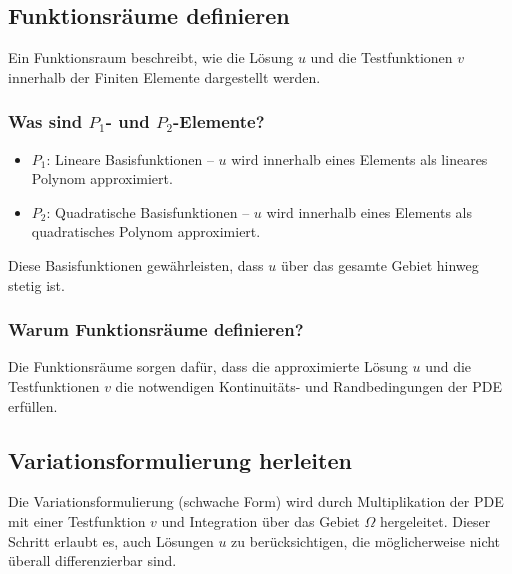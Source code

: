 \subsection{Funktionsräume definieren}
Ein Funktionsraum beschreibt, wie die Lösung $u$ und die Testfunktionen $v$ innerhalb der Finiten Elemente dargestellt werden.

\subsubsection{Was sind $P_1$- und $P_2$-Elemente?}
\begin{itemize}
	\item $P_1$: Lineare Basisfunktionen – $u$ wird innerhalb eines Elements als lineares Polynom approximiert.
	\item $P_2$: Quadratische Basisfunktionen – $u$ wird innerhalb eines Elements als quadratisches Polynom approximiert.
\end{itemize}
Diese Basisfunktionen gewährleisten, dass $u$ über das gesamte Gebiet hinweg stetig ist.

\subsubsection{Warum Funktionsräume definieren?}
Die Funktionsräume sorgen dafür, dass die approximierte Lösung $u$ und die Testfunktionen $v$ die notwendigen Kontinuitäts- und Randbedingungen der PDE erfüllen.

\subsection{Variationsformulierung herleiten}
Die Variationsformulierung (schwache Form) wird durch Multiplikation der PDE mit einer Testfunktion $v$ und Integration über das Gebiet $\Omega$ hergeleitet. Dieser Schritt erlaubt es, auch Lösungen $u$ zu berücksichtigen, die möglicherweise nicht überall differenzierbar sind.


